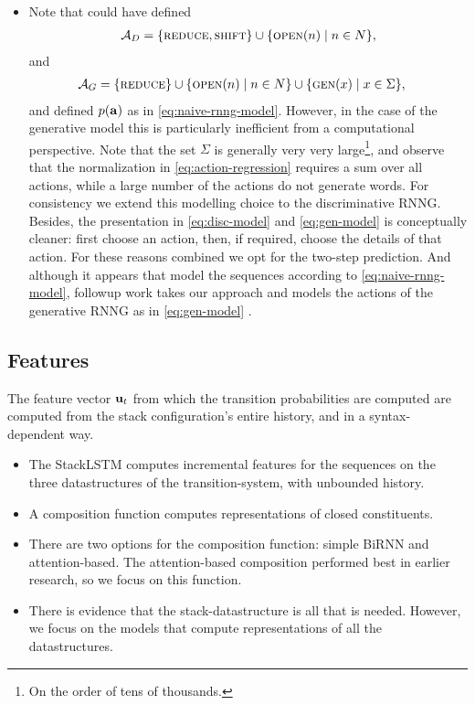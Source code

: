 \begin{itemize}
  \item Note that could have defined
  \begin{align*}
    \mathcal{A}_D &= \{ \textsc{reduce}, \textsc{shift} \} \cup \{ \textsc{open}(n) \mid n \in N \},  \\
  \end{align*}
  and
  \begin{align*}
    \mathcal{A}_G &= \{ \textsc{reduce} \} \cup \{ \textsc{open}(n) \mid n \in N \} \cup \{ \textsc{gen}(x) \mid x \in \Sigma \},
  \end{align*}
  and defined $p(\mathbf{a})$ as in \ref{eq:naive-rnng-model}. However, in the case of the generative model this is particularly inefficient from a computational perspective. Note that the set $\Sigma$ is generally very very large\footnote{On the order of tens of thousands.}, and observe that the normalization in \ref{eq:action-regression} requires a sum over all actions, while a large number of the actions do not generate words. For consistency we extend this modelling choice to the discriminative RNNG. Besides, the presentation in \ref{eq:disc-model} and \ref{eq:gen-model} is conceptually cleaner: first choose an action, then, if required, choose the details of that action. For these reasons combined we opt for the two-step prediction. And although it appears that \citet{Dyer+2016:RNNG} model the sequences according to \ref{eq:naive-rnng-model}, followup work takes our approach and models the actions of the generative RNNG as in \ref{eq:gen-model} \citep{Hale+2018:beam}.

\end{itemize}

\subsection{Features}
The feature vector $\mathbf{u}_t$ from which the transition probabilities are computed are computed from the stack configuration's entire history, and in a syntax-dependent way.
\begin{itemize}
  \item The StackLSTM computes incremental features for the sequences on the three datastructures of the transition-system, with unbounded history.
  \item A composition function computes representations of closed constituents.
  \item There are two options for the composition function: simple BiRNN and attention-based. The attention-based composition performed best in earlier research, so we focus on this function.
  \item There is evidence that the stack-datastructure is all that is needed. However, we focus on the models that compute representations of all the datastructures.
\end{itemize}

